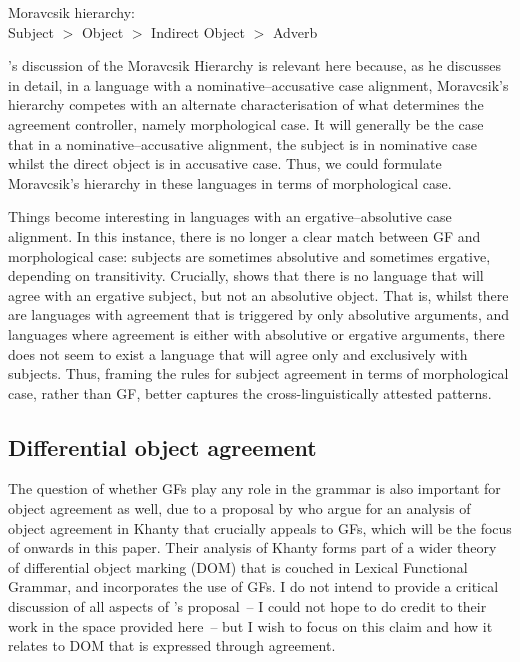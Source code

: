 \documentclass[output=paper
,modfonts
,nonflat]{langsci/langscibook}
\begin{document}
\begin{exe}
\ex Moravcsik hierarchy:\\
Subject $>$ Object $>$ Indirect Object $>$ Adverb
\end{exe}

\noindent \citeauthor{Bobaljik2008}'s discussion of the Moravcsik Hierarchy is relevant here because, as he discusses in detail, in a language with a nominative--accusative case alignment, Moravcsik's hierarchy competes with an alternate characterisation of what determines the agreement controller, namely morphological case.
It will generally be the case that in a nominative--accusative alignment, the subject is in nominative case whilst the direct object is in accusative case.
Thus, we could formulate Moravcsik's hierarchy in these languages in terms of morphological case.

Things become interesting in languages with an ergative--absolutive case alignment. In this instance, there is no longer a clear match between GF and morphological case: subjects are sometimes absolutive and sometimes ergative, depending on transitivity. Crucially, \citeauthor{Bobaljik2008} shows that there is no language that will agree with an ergative subject, but not an absolutive object.
That is, whilst there are languages with agreement that is triggered by only absolutive arguments, and languages where agreement is either with absolutive or ergative arguments, there does not seem to exist a language that will agree only and exclusively with subjects.
Thus, framing the rules for subject agreement in terms of morphological case, rather than GF, better captures the cross-linguistically attested patterns.

\subsection{Differential object agreement}

The question of whether GFs play any role in the grammar is also important for object agreement as well, due to a proposal by \citet{dn2011} who argue for an analysis of object agreement in Khanty that crucially appeals to GFs, which will be the focus of  onwards in this paper.
Their analysis of Khanty forms part of a wider theory of differential object marking (DOM) that is couched in Lexical Functional Grammar, and incorporates the use of GFs. I do not intend to provide a critical discussion of all aspects of \citeauthor{dn2011}'s proposal~-- I could not hope to do credit to their work in the space provided here~-- but I wish to focus on this claim and how it relates to DOM that is expressed through agreement.
\end{document}
